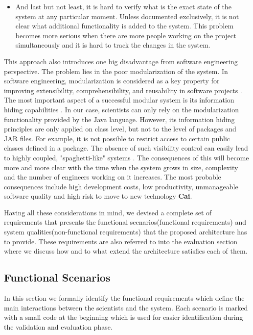 \begin{itemize}
	\item And last but not least, it is hard to verify what is the exact state of the system at any particular moment. Unless documented exclusively, it is not clear what additional functionality is added to the system. This problem becomes more serious when there are more people working on the project simultaneously and it is hard to track the changes in the system.
		
\end{itemize}

This approach also introduces one big disadvantage from software engineering perspective. The problem lies in the poor modularization of the system. In software engineering, modularization is considered as a key property for improving extensibility, comprehensibility, and reusability in software projects \cite{Parnas}. The most important aspect of a successful modular system is its information hiding capabilities \cite{Srivastava}. In our case, scientists can only rely on the modularization functionality provided by the Java language. However, its information hiding principles are only applied on class level, but not to the level of packages and JAR files. For example, it is not possible to restrict access to certain public classes defined in a package. The absence of such visibility control can easily lead to highly coupled, "spaghetti-like" systems \cite{Eder}. The consequences of this will become more and more clear with the time when the system grows in size, complexity and the number of engineers working on it increases. The most probable consequences include high development costs, low productivity, unmanageable software quality and high risk to move to new technology \textbf{Cai}.

Having all these considerations in mind, we devised a complete set of requirements that presents the functional scenarios(functional requirements) and system qualities(non-functional requirements) that the proposed architecture has to provide. These requirements are also referred to into the evaluation section where we discuss how and to what extend the architecture satisfies each of them.


\subsection{Functional Scenarios}
In this section we formally identify the functional requirements which define the main interactions between the scientists and the system. Each scenario is marked with a small code at the beginning which is used for easier identification during the validation and evaluation phase.

